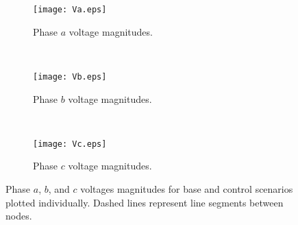 

\begin{figure}[t]
\centering
\begin{subfigure}[b]{0.49\textwidth}
	\centering
	\texttt{[image: Va.eps]}
	\caption{Phase $a$ voltage magnitudes.}
	\label{fig:Va}
\end{subfigure}
\\
\begin{subfigure}[b]{0.49\textwidth}
	\centering
	\texttt{[image: Vb.eps]}
	\caption{Phase $b$ voltage magnitudes.}
	\label{fig:Vb}
\end{subfigure}
\\
\begin{subfigure}[b]{0.49\textwidth}
	\centering
	\texttt{[image: Vc.eps]}
	\caption{Phase $c$ voltage magnitudes.}
	\label{fig:Vc}
\end{subfigure}
\caption{Phase $a$, $b$, and $c$ voltages magnitudes for base and control scenarios plotted individually. Dashed lines represent line segments between nodes.}
\label{fig:Vres}
\end{figure}


